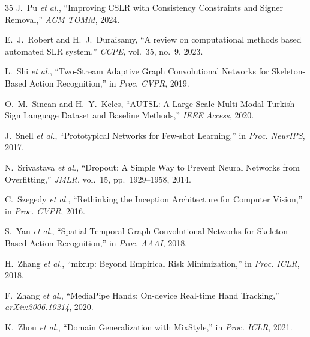 \documentclass[conference]{IEEEtran}
\begin{document}
\begin{thebibliography}{35}
J.~Pu \textit{et al.}, ``Improving CSLR with Consistency Constraints and Signer Removal,'' \textit{ACM TOMM}, 2024.

E.~J.~Robert and H.~J.~Duraisamy, ``A review on computational methods based automated SLR system,'' \textit{CCPE}, vol.~35, no.~9, 2023.

L.~Shi \textit{et al.}, ``Two-Stream Adaptive Graph Convolutional Networks for Skeleton-Based Action Recognition,'' in \textit{Proc. CVPR}, 2019.

O.~M.~Sincan and H.~Y.~Keles, ``AUTSL: A Large Scale Multi-Modal Turkish Sign Language Dataset and Baseline Methods,'' \textit{IEEE Access}, 2020.

J.~Snell \textit{et al.}, ``Prototypical Networks for Few-shot Learning,'' in \textit{Proc. NeurIPS}, 2017.

N.~Srivastava \textit{et al.}, ``Dropout: A Simple Way to Prevent Neural Networks from Overfitting,'' \textit{JMLR}, vol.~15, pp.~1929--1958, 2014.

C.~Szegedy \textit{et al.}, ``Rethinking the Inception Architecture for Computer Vision,'' in \textit{Proc. CVPR}, 2016.

S.~Yan \textit{et al.}, ``Spatial Temporal Graph Convolutional Networks for Skeleton-Based Action Recognition,'' in \textit{Proc. AAAI}, 2018.

H.~Zhang \textit{et al.}, ``mixup: Beyond Empirical Risk Minimization,'' in \textit{Proc. ICLR}, 2018.

F.~Zhang \textit{et al.}, ``MediaPipe Hands: On-device Real-time Hand Tracking,'' \textit{arXiv:2006.10214}, 2020.

K.~Zhou \textit{et al.}, ``Domain Generalization with MixStyle,'' in \textit{Proc. ICLR}, 2021.

\end{thebibliography}
\end{document}
